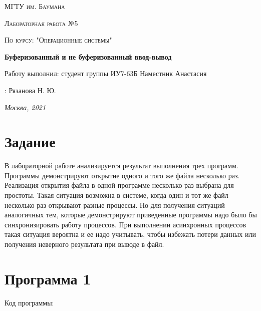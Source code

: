 \documentclass[12pt]{report}
\begin{document}
 
\begin{titlepage}
	\centering
	{\scshape\LARGE МГТУ им. Баумана \par}
	\vspace{3cm}
	{\scshape\Large Лабораторная работа №5\par}
	\vspace{0.5cm}	
	{\scshape\Large По курсу: "Операционные системы"\par}
	\vspace{1.5cm}
	{\huge\bfseries Буферизованный и не буферизованный ввод-вывод\par}
	\vspace{2cm}
	\Large Работу выполнил: студент группы ИУ7-63Б Наместник Анастасия\par
	\vspace{0.5cm}
	:  Рязанова Н. Ю.\par

	\vfill
	\large \textit {Москва, 2021} \par
\end{titlepage}


\newpage
	
\section{Задание}
В лабораторной работе анализируется результат выполнения трех программ. Программы демонстрируют открытие одного и того же файла несколько раз. Реализация открытия файла в одной программе несколько раз выбрана для простоты. Такая ситуация возможна в системе, когда один и тот же файл несколько раз открывают разные процессы. Но для получения ситуаций аналогичных тем, которые демонстрируют приведенные программы надо было бы синхронизировать работу процессов. При выполнении асинхронных процессов такая ситуация вероятна и ее надо учитывать, чтобы избежать потери данных или получения неверного результата при выводе в файл.	
		
\section{Программа 1}

Код программы:
\end{document}

